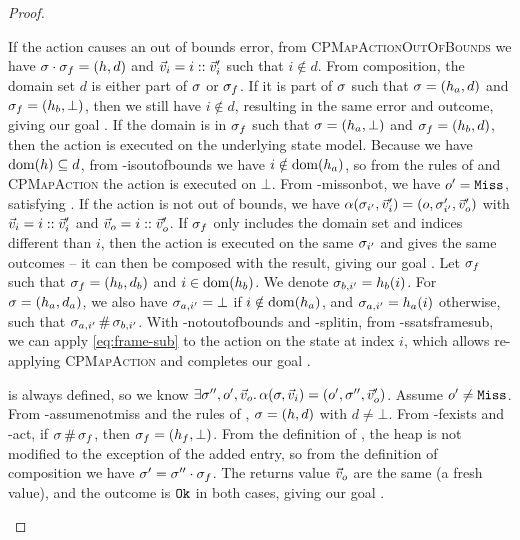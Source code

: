 \begin{proof}
\pfcase{$\alpha\in\actions_\mmdl$}

\begin{hypvlist}
 If the action causes an out of bounds error, from \textsc{CPMapActionOutOfBounds} we have $\sigma\cdot \sigma_f=(h,d)$ and $\vec{v}_i=i::\vec{v}_i'$ such that $i\notin d$.
 From composition, the domain set $d$ is either part of $\sigma$ or $\sigma_f$. If it is part of $\sigma$ such that $\sigma=(h_a, d)$ and $\sigma_f=(h_b, \bot)$, then we still have $i\notin d$, resulting in the same error and outcome, giving our goal .
 If the domain is in $\sigma_f$ such that $\sigma=(h_a,\bot)$ and $\sigma_f=(h_b,d)$, then the action is executed on the underlying state model. Because we have $\operatorname{dom}(h)\subseteq d$, from \hyp{isoutofbounds} we have $i\notin \operatorname{dom}(h_a)$, so from the rules of  and \textsc{CPMapAction} the action is executed on $\bot$. {\color{red}From \hyp{missonbot}, we have $o'=\texttt{Miss}$, satisfying .}
 If the action is not out of bounds, we have $\alpha(\sigma_{i'},\vec{v}_i')=(o,\sigma_{i'}',\vec{v}_o')$ with $\vec{v}_i=i::\vec{v}_i'$ and $\vec{v}_o=i::\vec{v}_o'$.
 If $\sigma_f$ only includes the domain set and indices different than $i$, then the action is executed on the same $\sigma_{i'}$ and gives the same outcomes -- it can then be composed with the result, giving our goal .
 Let $\sigma_f$ such that $\sigma_f=(h_b,d_b)$ and $i\in\operatorname{dom}(h_b)$. We denote $\sigma_{b,i'}=h_b(i)$. For $\sigma=(h_a,d_a)$, we also have $\sigma_{a,i'}=\bot$ if $i\notin \operatorname{dom}(h_a)$, and $\sigma_{a,i'}=h_a(i)$ otherwise, such that $\sigma_{a,i'}\operatorname{\#}\sigma_{b,i'}$.
 With \hyp{notoutofbounds} and \hyp{splitin}, from \hyp{ssatsframesub}, we can apply \ref{eq:frame-sub} to the action on the state at index $i$, which allows re-applying \textsc{CPMapAction} and completes our goal .
\end{hypvlist}

\pfcase{$\alpha=\alloc$}

\begin{hypvlist}
 \alloc{} is always defined, so we know $\exists \sigma'',o',\vec{v}_o\ldotp \alpha(\sigma,\vec{v}_i)=(o',\sigma'',\vec{v}_o')$.
 Assume $o'\neq\texttt{Miss}$.
 From \hyp{assumenotmiss} and the rules of \alloc{}, $\sigma=(h,d)$ with $d\neq\bot$.
 From \hyp{fexists} and \hyp{act}, if $\sigma\operatorname{\#}\sigma_f$, then $\sigma_f=(h_f,\bot)$.
 From the definition of \alloc{}, the heap is not modified to the exception of the added entry, so from the definition of composition we have $\sigma'=\sigma''\cdot\sigma_f$. The returns value $\vec{v}_o$ are the same (a fresh value), and the outcome is $\texttt{Ok}$ in both cases, giving our goal .
\end{hypvlist}


\end{proof}
